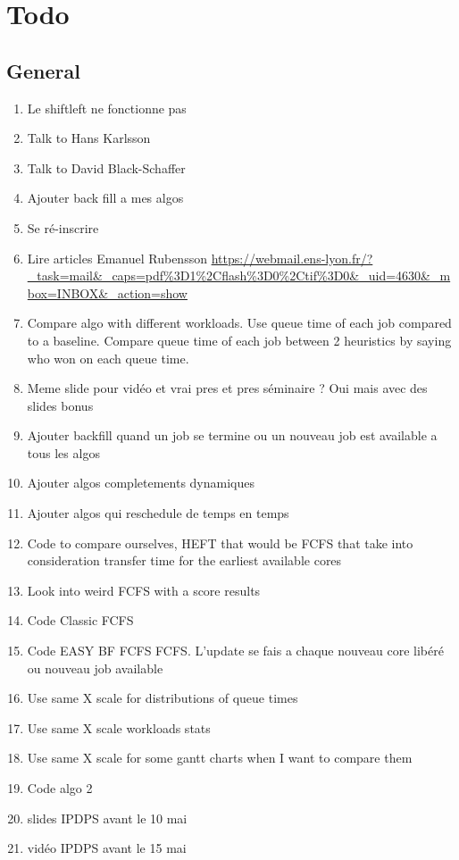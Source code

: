 \documentclass[a4paper]{article}
\begin{document}
\section{Todo}
	\subsection{General}
		\begin{enumerate}
			\item Le shiftleft ne fonctionne pas
			\item Talk to Hans Karlsson
			\item Talk to David Black-Schaffer
			\item Ajouter back fill a mes algos
			\item Se ré-inscrire
			\item Lire articles Emanuel Rubensson \url{https://webmail.ens-lyon.fr/?_task=mail&_caps=pdf%3D1%2Cflash%3D0%2Ctif%3D0&_uid=4630&_mbox=INBOX&_action=show}
			\item Compare algo with different workloads. Use queue time of each job compared to a baseline. Compare queue time of each job between 2 heuristics by saying who won on each queue time.
			\item Meme slide pour vidéo et vrai pres et pres séminaire ? Oui mais avec des slides bonus
			\item Ajouter backfill quand un job se termine ou un nouveau job est available a tous les algos
			\item Ajouter algos completements dynamiques
			\item Ajouter algos qui reschedule de temps en temps
			\item Code to compare ourselves, HEFT that would be FCFS that take into consideration transfer time for the earliest available cores
			\item Look into weird FCFS with a score results
			\item Code Classic FCFS
			\item Code EASY BF FCFS FCFS. L'update se fais a chaque nouveau core libéré ou nouveau job available
			\item Use same X scale for distributions of queue times
			\item Use same X scale workloads stats
			\item Use same X scale for some gantt charts when I want to compare them
			\item Code algo 2
			\item slides IPDPS avant le 10 mai
			\item vidéo IPDPS avant le 15 mai

\end{enumerate}
\end{document}
